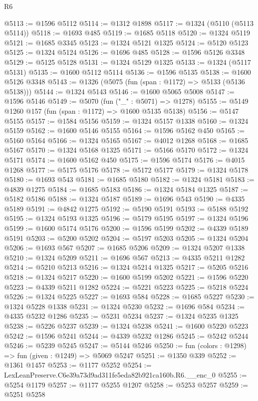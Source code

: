 \begin{lexlean}{R6}
\begin{coremodule}
@5113 := @1596 @5112
@5114 := @1312 @1898
@5117 := @1324 (@5110 (@5113 @5114))
@5118 := @1693 @485
@5119 := @1685 @5118
@5120 := @1324 @5119
@5121 := @1685 @3345
@5123 := @1324 @5121 @1325
@5124 := @5120 @5123
@5125 := @1324 @5124
@5126 := @1696 @485
@5128 := @1596 @5126 @3348
@5129 := @5125 @5128
@5131 := @1324 @5129 @1325
@5133 := @1324 (@5117 @5131)
@5135 := @1600 @5112 @5114
@5136 := @1596 @5135
@5138 := @1600 @5126 @3348
@5143 := @1326 (@5075 (fun (span : @1172) => @5133 (@5136 @5138)))
@5144 := @1324 @5143
@5146 := @1600 @5065 @5008
@5147 := @1596 @5146
@5149 := @5070 (fun ("_" : @5071) => @1278)
@5155 := @5149 @1260 @157 (fun (span : @1172) => @1600 @5135 @5138)
@5156 := @5147 @5155
@5157 := @1584 @5156
@5159 := @1324 @5157 @1338
@5160 := @1324 @5159
@5162 := @1600 @5146 @5155
@5164 := @1596 @5162 @450
@5165 := @5160 @5164
@5166 := @1324 @5165
@5167 := @4012 @1268
@5168 := @1685 @5167
@5170 := @1324 @5168 @1325
@5171 := @5166 @5170
@5172 := @1324 @5171
@5174 := @1600 @5162 @450
@5175 := @1596 @5174
@5176 := @4015 @1268
@5177 := @5175 @5176
@5178 := @5172 @5177
@5179 := @1324 @5178
@5180 := @1693 @543
@5181 := @1685 @5180
@5182 := @1324 @5181
@5183 := @4839 @1275
@5184 := @1685 @5183
@5186 := @1324 @5184 @1325
@5187 := @5182 @5186
@5188 := @1324 @5187
@5189 := @1696 @543
@5190 := @4335 @5189
@5191 := @4842 @1275
@5192 := @5190 @5191
@5193 := @5188 @5192
@5195 := @1324 @5193 @1325
@5196 := @5179 @5195
@5197 := @1324 @5196
@5199 := @1600 @5174 @5176
@5200 := @1596 @5199
@5202 := @4339 @5189 @5191
@5203 := @5200 @5202
@5204 := @5197 @5203
@5205 := @1324 @5204
@5206 := @1693 @567
@5207 := @1685 @5206
@5209 := @1324 @5207 @1338
@5210 := @1324 @5209
@5211 := @1696 @567
@5213 := @4335 @5211 @1282
@5214 := @5210 @5213
@5216 := @1324 @5214 @1325
@5217 := @5205 @5216
@5218 := @1324 @5217
@5220 := @1600 @5199 @5202
@5221 := @1596 @5220
@5223 := @4339 @5211 @1282
@5224 := @5221 @5223
@5225 := @5218 @5224
@5226 := @1324 @5225
@5227 := @1693 @584
@5228 := @1685 @5227
@5230 := @1324 @5228 @1338
@5231 := @1324 @5230
@5232 := @1696 @584
@5234 := @4335 @5232 @1286
@5235 := @5231 @5234
@5237 := @1324 @5235 @1325
@5238 := @5226 @5237
@5239 := @1324 @5238
@5241 := @1600 @5220 @5223
@5242 := @1596 @5241
@5244 := @4339 @5232 @1286
@5245 := @5242 @5244
@5246 := @5239 @5245
@5247 := @5144 @5246
@5250 := fun (colors : @1298) => fun (given : @1249) => @5069 @5247
@5251 := @1350 @339
@5252 := @1361 @1457
@5253 := @1177 @5252
@5254 := LexLeanPreserve.C6e39a73d9ad311fe5eda82b921ca160b.R6.__enc_0
@5255 := @5254 @1179
@5257 := @1177 @5255 @1207
@5258 := @5253 @5257
@5259 := @5251 @5258

\end{coremodule}
\end{lexlean}
